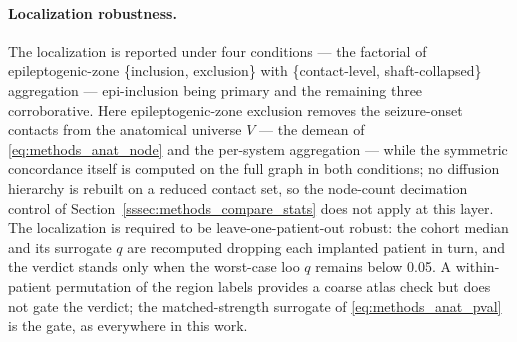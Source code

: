 \paragraph{Localization robustness.}
The localization is reported under four conditions --- the factorial of epileptogenic-zone \{inclusion, exclusion\} with \{contact-level, shaft-collapsed\} aggregation --- epi-inclusion being primary and the remaining three corroborative. Here epileptogenic-zone exclusion removes the seizure-onset contacts from the anatomical universe \(V\) --- the demean of \eqref{eq:methods_anat_node} and the per-system aggregation --- while the symmetric concordance itself is computed on the full graph in both conditions; no diffusion hierarchy is rebuilt on a reduced contact set, so the node-count decimation control of Section~\ref{sssec:methods_compare_stats} does not apply at this layer. The localization is required to be leave-one-patient-out robust: the cohort median and its surrogate \(q\) are recomputed dropping each implanted patient in turn, and the verdict stands only when the worst-case \gls{loo} \(q\) remains below \num{0.05}. A within-patient permutation of the region labels provides a coarse atlas check but does not gate the verdict; the matched-strength surrogate of \eqref{eq:methods_anat_pval} is the gate, as everywhere in this work.


%
